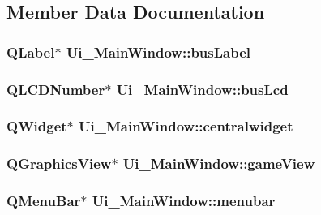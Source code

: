 \subsection{Member Data Documentation}
\hypertarget{class_ui___main_window_ad6aa0aabd2b7ea587a730d7507eb3a33}{
\subsubsection[{bus\-Label}]{\setlength{\rightskip}{0pt plus 5cm}Q\-Label$\ast$ Ui\-\_\-\-Main\-Window\-::bus\-Label}}\label{class_ui___main_window_ad6aa0aabd2b7ea587a730d7507eb3a33}
\hypertarget{class_ui___main_window_aa5a21b4a3f6c07e5a7966c453ded132c}{
\subsubsection[{bus\-Lcd}]{\setlength{\rightskip}{0pt plus 5cm}Q\-L\-C\-D\-Number$\ast$ Ui\-\_\-\-Main\-Window\-::bus\-Lcd}}\label{class_ui___main_window_aa5a21b4a3f6c07e5a7966c453ded132c}
\hypertarget{class_ui___main_window_a356f1cf3ebda15f1fac59467ee081b74}{
\subsubsection[{centralwidget}]{\setlength{\rightskip}{0pt plus 5cm}Q\-Widget$\ast$ Ui\-\_\-\-Main\-Window\-::centralwidget}}\label{class_ui___main_window_a356f1cf3ebda15f1fac59467ee081b74}
\hypertarget{class_ui___main_window_ae663973f203ce9ab1eeb16a5f447f01b}{
\subsubsection[{game\-View}]{\setlength{\rightskip}{0pt plus 5cm}Q\-Graphics\-View$\ast$ Ui\-\_\-\-Main\-Window\-::game\-View}}\label{class_ui___main_window_ae663973f203ce9ab1eeb16a5f447f01b}
\hypertarget{class_ui___main_window_adf43d9a67adaec750aaa956b5e082f09}{
\subsubsection[{menubar}]{\setlength{\rightskip}{0pt plus 5cm}Q\-Menu\-Bar$\ast$ Ui\-\_\-\-Main\-Window\-::menubar}}\label{class_ui___main_window_adf43d9a67adaec750aaa956b5e082f09}

